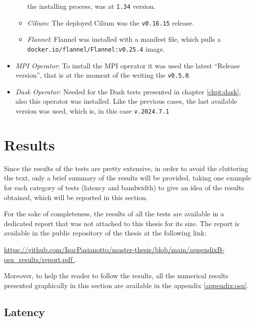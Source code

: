 \begin{itemize}
\begin{itemize}
        the installing process, was at \texttt{1.34} version.
      \item \textit{Cilium}: The deployed Cilium was the \texttt{v0.16.15}
        release.
      \item \textit{Flannel}: Flannel was installed with a manifest file, which
        pulls a \\ \texttt{docker.io/flannel/Flannel:v0.25.4} image.
    \end{itemize}
  \item \textit{MPI Operator}: To install the MPI operator it was used the
    latest ``Release version'', that is at the moment of the writing the
    \texttt{v0.5.0}.
  \item \textit{Dask Operator}: Needed for the Dask tests presented in chapter
    \ref{chpt:dask}, also this operator was installed. Like the previous cases,
    the last available version was used, which is, in this case
    \texttt{v.2024.7.1}
\end{itemize}


\section{Results}\label{sec:cniresuls}

Since the results of the tests are pretty extensive, in order to avoid the
cluttering the text, only a brief summary of the results will be provided,
taking one example for each category of tests (latency and bandwidth) to give an
idea of the results obtained, which will be reported in this section.

For the sake of completeness, the results of all the tests are available in a
dedicated report that was not attached to this thesis for its size.
The report is available in the public repository of the thesis at the following link:

\begin{center}
  \small
  \url{
    https://github.com/IsacPasianotto/master-thesis/blob/main/appendixB-osu_results/report.pdf
  }.
\end{center}

Moreover, to help the reader to follow the results, all the numerical results
presented graphically in this section are available in the appendix \ref{appendix:osu}.

\subsection{Latency}\label{subsec:results-latency}

